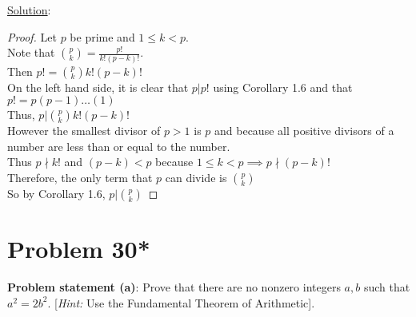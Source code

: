\documentclass{article} %
\begin{document}
\underline{Solution}: 
\begin{addmargin}[1em]{0em}
\begin{proof}
Let $p$ be prime and $1 \leq k < p$.
\\Note that $\binom{p}{k} = \frac{p!}{k!(p-k)!}$.
\\Then $p! = \binom{p}{k}k!(p-k)!$
\\On the left hand side, it is clear that $p|p!$ using Corollary 1.6 and that $p! = p(p-1) \ldots (1)$
\\Thus, $p|\binom{p}{k}k!(p-k)!$
\\However the smallest divisor of $p > 1$ is $p$ and because all positive divisors of a number are less than or equal to the number.
\\Thus $p \nmid k!$ and $(p-k) < p$ because $1 \leq k < p \implies p \nmid (p-k)!$
\\Therefore, the only term that $p$ can divide is $\binom{p}{k}$
\\So by Corollary 1.6, $p|\binom{p}{k}$
\end{proof}
\end{addmargin}

\newpage

\section*{Problem 30*}


\textbf{Problem statement (a)}:  Prove that there are no nonzero integers $a,b$ such that $a^2 = 2b^2$.  [\textit{Hint:} Use the Fundamental Theorem of Arithmetic].
\\
\end{document}
